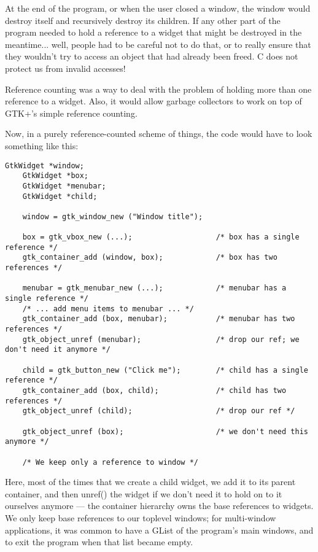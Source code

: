 At the end of the program, or when the user closed a window, the
window would destroy itself and recursively destroy its children.  If
any other part of the program needed to hold a reference to a widget
that might be destroyed in the meantime... well, people had to be
careful not to do that, or to really ensure that they wouldn't try to
access an object that had already been freed.  C does not protect us
from invalid accesses!

Reference counting was a way to deal with the problem of holding more
than one reference to a widget.  Also, it would allow garbage
collectors to work on top of GTK+'s simple reference counting.

Now, in a purely reference-counted scheme of things, the code would
have to look something like this:

\begin{lstlisting}[basicstyle=\footnotesize]
    GtkWidget *window;
    GtkWidget *box;
    GtkWidget *menubar;
    GtkWidget *child;

    window = gtk_window_new ("Window title");

    box = gtk_vbox_new (...);                   /* box has a single reference */
    gtk_container_add (window, box);            /* box has two references */

    menubar = gtk_menubar_new (...);            /* menubar has a single reference */
    /* ... add menu items to menubar ... */
    gtk_container_add (box, menubar);           /* menubar has two references */
    gtk_object_unref (menubar);                 /* drop our ref; we don't need it anymore */

    child = gtk_button_new ("Click me");        /* child has a single reference */
    gtk_container_add (box, child);             /* child has two references */
    gtk_object_unref (child);                   /* drop our ref */

    gtk_object_unref (box);                     /* we don't need this anymore */ 

    /* We keep only a reference to window */
\end{lstlisting}

Here, most of the times that we create a child widget, we add it to
its parent container, and then unref() the widget if we don't need it
to hold on to it ourselves anymore --- the container hierarchy owns
the base references to widgets.  We only keep base references to our
toplevel windows; for multi-window applications, it was common to have
a GList of the program's main windows, and to exit the program when
that list became empty.


